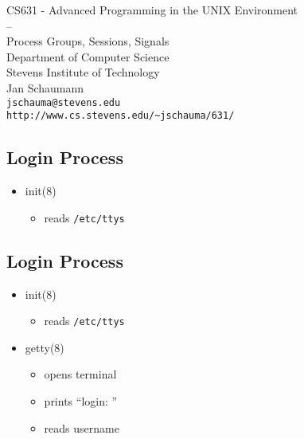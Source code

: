 \documentclass[xga]{xdvislides}
\begin{document}
\setfontphv

\lhead{\slidetitle}
\cfoot{\relax}
\rfoot{\Gray{\today}}

\vspace*{\fill}
\begin{center}
	\Hugesize
		CS631 - Advanced Programming in the UNIX Environment\\
		-- \\
		Process Groups, Sessions, Signals
	\hspace*{5mm}\blueline\\ [1em]
	\Normalsize
		Department of Computer Science\\
		Stevens Institute of Technology\\
		Jan Schaumann\\
		\verb+jschauma@stevens.edu+\\
		\verb+http://www.cs.stevens.edu/~jschauma/631/+
\end{center}
\vspace*{\fill}

\subsection{Login Process}
\begin{itemize}
	\item init(8)
		\begin{itemize}
			\item reads {\tt /etc/ttys}
		\end{itemize}
\end{itemize}

\subsection{Login Process}
\begin{itemize}
	\item init(8)
		\begin{itemize}
			\item reads {\tt /etc/ttys}
		\end{itemize}
	\item getty(8)
		\begin{itemize}
			\item opens terminal
			\item prints ``login: ''
			\item reads username
		\end{itemize}
\end{itemize}
\end{document}
